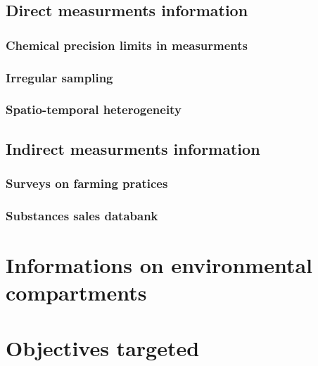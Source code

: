 \subsection{Direct measurments information}

\subsubsection{Chemical precision limits in measurments}

\subsubsection{Irregular sampling}

\subsubsection{Spatio-temporal heterogeneity}

\subsection{Indirect measurments information}

\subsubsection{Surveys on farming pratices}

\subsubsection{Substances sales databank}



\section{Informations on environmental compartments}\label{chp:2:4}



\section{Objectives targeted}\label{chp:2:5}